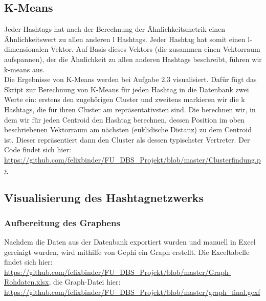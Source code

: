\documentclass[BCOR0mm,fontsize=12pt,paper=a4,final,numbers=noenddot]{scrartcl}
\begin{document}
\subsection{K-Means}
Jeder Hashtags hat nach der Berechnung der Ähnlichkeitsmetrik einen Ähnlichkeitswert zu allen anderen l Hashtags. Jeder Hashtag hat somit einen l-dimensionalen Vektor. Auf Basis dieses Vektors (die zusammen einen Vektorraum aufspannen), der die Ähnlichkeit zu allen anderen Hashtags beschreibt, führen wir k-means aus.\\
Die Ergebnisse von K-Means werden bei Aufgabe 2.3 visualisiert. Dafür fügt das Skript zur Berechnung von K-Means für jeden Hashtag in die Datenbank zwei Werte ein: erstens den zugehörigen Cluster und zweitens markieren wir die k Hashtags, die für ihren Cluster am repräsentativsten sind. Die berechnen wir, in dem wir für jeden Centroid den Hashtag berechnen, dessen Position im oben beschriebenen Vektorraum am nächsten (euklidische Distanz) zu dem Centroid ist. Dieser repräsentiert dann den Cluster als dessen typischster Vertreter. Der Code findet sich hier: \url{https://github.com/felixbinder/FU_DBS_Projekt/blob/master/Clusterfindung.py}

\subsection{Visualisierung des Hashtagnetzwerks}
\subsubsection{Aufbereitung des Graphens}
Nachdem die Daten aus der Datenbank exportiert wurden und manuell in Excel gereinigt wurden, wird mithilfe von Gephi ein Graph erstellt. Die Exceltabelle findet sich hier: \url{https://github.com/felixbinder/FU_DBS_Projekt/blob/master/Graph-Rohdaten.xlsx}, die Graph-Datei hier: \url{https://github.com/felixbinder/FU_DBS_Projekt/blob/master/graph_final.gexf}
\end{document}
